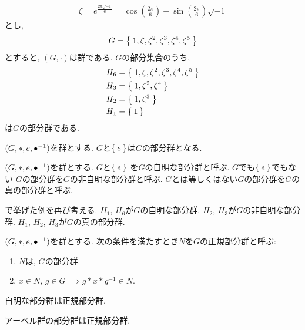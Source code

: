 \begin{example}
  \label{grp:ex:subgrp:c6}
  \begin{align*}
    \zeta = e^{\frac{2\pi\sqrt{-1}}{6}}= \cos(\frac{2\pi}{6})+\sin(\frac{2\pi}{6})\sqrt{-1}
  \end{align*}
  とし,
  \begin{align*}
    G=\Set{1,\zeta,\zeta^2,\zeta^3,\zeta^4,\zeta^5}
  \end{align*}
  とすると, $(G,\cdot)$は群である.
  $G$の部分集合のうち,
  \begin{align*}
    H_6&=\Set{1,\zeta,\zeta^2,\zeta^3,\zeta^4,\zeta^5}\\
    H_3&=\Set{1,\zeta^2,\zeta^4}\\
    H_2&=\Set{1,\zeta^3}\\
    H_1&=\Set{1}
  \end{align*}
  は$G$の部分群である.
\end{example}



\begin{example}
  $(G,\ast,e,{\bullet}^{-1})$を群とする.
  $G$と$\Set{e}$は$G$の部分群となる.
\end{example}

\begin{definition}
  $(G,\ast,e,{\bullet}^{-1})$を群とする.
  $G$と$\Set{e}$
  を$G$の自明な部分群と呼ぶ.
  $G$でも$\Set{e}$でもない
  $G$の部分群を$G$の非自明な部分群と呼ぶ.
  $G$とは等しくはない$G$の部分群を$G$の真の部分群と呼ぶ.
\end{definition}

\begin{example}
  で挙げた例を再び考える.
  $H_1$, $H_6$が$G$の自明な部分群.
  $H_2$, $H_3$が$G$の非自明な部分群.
  $H_1$, $H_2$, $H_3$が$G$の真の部分群.
\end{example}

\begin{definition}
  $(G,\ast,e,{\bullet}^{-1})$を群とする.
  次の条件を満たすとき$N$を$G$の正規部分群と呼ぶ:
  \begin{enumerate}
  \item $N$は, $G$の部分群.
  \item $x\in N$, $g\in G \implies g \ast x \ast g^{-1} \in N$.
  \end{enumerate}
\end{definition}
\begin{example}
  自明な部分群は正規部分群.
\end{example}
\begin{example}
  アーベル群の部分群は正規部分群.
\end{example}



